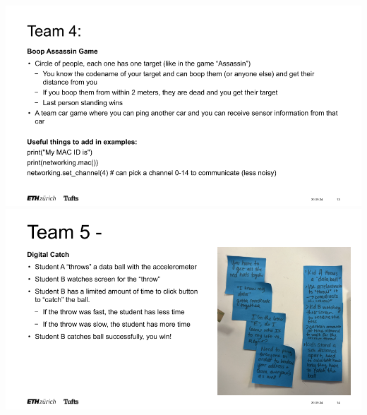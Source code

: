 \includegraphics[width=\linewidth]{overleaf/images/Hackathon4.png}
\includegraphics[width=\linewidth]{overleaf/images/Hackathon5.png}
